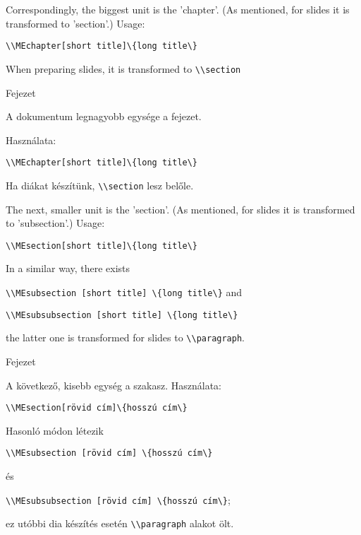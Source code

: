 {
Correspondingly, the biggest unit is the 'chapter'.
(As mentioned, for slides it is transformed to 'section'.)
Usage:\par
\noindent\lstinline|\\MEchapter[short title]\{long title\}|

When preparing slides, it is transformed to \lstinline|\\section|
}
{Fejezet}
{

A dokumentum legnagyobb egysége a fejezet.

Használata:\par
\noindent\lstinline|\\MEchapter[short title]\{long title\}|

Ha diákat készítünk,  \lstinline|\\section| lesz belőle.

}

{
The next, smaller unit is the 'section'.
(As mentioned, for slides it is transformed to 'subsection'.)
Usage:\par
\noindent\lstinline|\\MEsection[short title]\{long title\}|

In a similar way, there exists

\lstinline|\\MEsubsection [short title] \{long title\}|
and

\lstinline|\\MEsubsubsection [short title] \{long title\}|

 the latter one is
transformed for slides to \lstinline|\\paragraph|.
}
{Fejezet}
{
A következő, kisebb egység a szakasz.
Használata:\par
\noindent\lstinline|\\MEsection[rövid cím]\{hosszú cím\}|

Hasonló módon létezik

\lstinline|\\MEsubsection [rövid cím] \{hosszú cím\}|


és

\lstinline|\\MEsubsubsection [rövid cím] \{hosszú cím\}|; 

ez utóbbi dia készítés esetén \lstinline|\\paragraph| alakot ölt.

}

